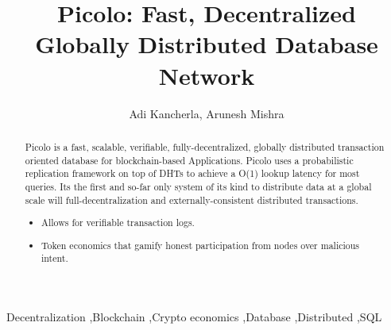 \documentclass[preprint,12pt]{elsarticle}
\begin{document}
\begin{frontmatter}


\title{Picolo: Fast, Decentralized Globally Distributed Database Network}

\author{Adi Kancherla, Arunesh Mishra}
\address{San Francisco, California}




\begin{abstract}
Picolo is a fast, scalable, verifiable, fully-decentralized, globally distributed transaction oriented database for
blockchain-based Applications. Picolo uses a probabilistic replication framework on top of DHTs to achieve a O(1)
lookup latency for most queries. Its the first and so-far only system of its kind to distribute data at a global
scale will full-decentralization and externally-consistent distributed transactions.

\begin{itemize}
    \item Allows for verifiable transaction logs.
    \item Token economics that gamify honest participation from nodes over malicious intent.
\end{itemize}
\end{abstract}

\begin{keyword}
Decentralization \sep Blockchain \sep Crypto economics \sep Database \sep Distributed \sep SQL


\end{keyword}

\end{frontmatter}
\end{document}
